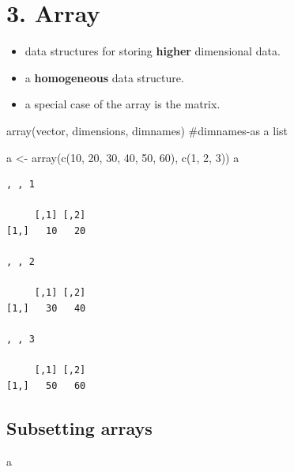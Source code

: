\documentclass[
  letterpaper,
  DIV=11,
  numbers=noendperiod]{scrreprt}
\newenvironment{Shaded}{\begin{snugshade}}{\end{snugshade}}
\newcommand{\CommentTok}[1]{\textcolor[rgb]{0.37,0.37,0.37}{#1}}
\newcommand{\DecValTok}[1]{\textcolor[rgb]{0.68,0.00,0.00}{#1}}
\newcommand{\FunctionTok}[1]{\textcolor[rgb]{0.28,0.35,0.67}{#1}}
\newcommand{\NormalTok}[1]{\textcolor[rgb]{0.00,0.23,0.31}{#1}}
\newcommand{\OtherTok}[1]{\textcolor[rgb]{0.00,0.23,0.31}{#1}}
\begin{document}
\section{3. Array}\label{array}

\begin{itemize}
\item
  data structures for storing \textbf{higher} dimensional data.
\item
  a \textbf{homogeneous} data structure.
\item
  a special case of the array is the matrix.
\end{itemize}

\begin{Shaded}
\begin{Highlighting}[]
\FunctionTok{array}\NormalTok{(vector, dimensions, dimnames) }\CommentTok{\#dimnames{-}as a list}
\end{Highlighting}
\end{Shaded}

\begin{Shaded}
\begin{Highlighting}[]
\NormalTok{a }\OtherTok{\textless{}{-}}  \FunctionTok{array}\NormalTok{(}\FunctionTok{c}\NormalTok{(}\DecValTok{10}\NormalTok{, }\DecValTok{20}\NormalTok{, }\DecValTok{30}\NormalTok{, }\DecValTok{40}\NormalTok{, }\DecValTok{50}\NormalTok{, }\DecValTok{60}\NormalTok{), }\FunctionTok{c}\NormalTok{(}\DecValTok{1}\NormalTok{, }\DecValTok{2}\NormalTok{, }\DecValTok{3}\NormalTok{))}
\NormalTok{a}
\end{Highlighting}
\end{Shaded}

\begin{verbatim}
, , 1

     [,1] [,2]
[1,]   10   20

, , 2

     [,1] [,2]
[1,]   30   40

, , 3

     [,1] [,2]
[1,]   50   60
\end{verbatim}

\subsection{Subsetting arrays}\label{subsetting-arrays}

\begin{Shaded}
\begin{Highlighting}[]
\NormalTok{a}
\end{Highlighting}
\end{Shaded}
\end{document}
